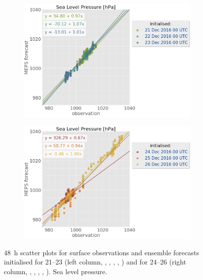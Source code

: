 \begin{figure}[t!]
	\centering
	\begin{subfigure}[b]{0.49\textwidth}
		\includegraphics[trim={0.cm 0cm 12.5cm 0cm},clip,
		width=\textwidth]{./fig_sfc_pressure/obs_model_20161221_23_00}
		\caption{}\label{fig:scat:pres2123}
	\end{subfigure}
	\begin{subfigure}[b]{0.49\textwidth}
		\includegraphics[trim={0.cm 0cm 12.5cm 0cm},clip,
		width=\textwidth]{./fig_sfc_pressure/obs_model_20161224_26_00}
		\caption{}\label{fig:scat:pres2426}
	\end{subfigure}
	\caption{\SI{48}{\hour} scatter plots for surface observations and ensemble forecasts initialised for \SIrange{21}{23}{\dec} (left column, \protect{}, \protect{}, \protect{}, \protect{}, \protect{}) and  for \SIrange{24}{26}{\dec} (right column, \protect{}, \protect{}, \protect{}, \protect{}, \protect{}). Sea level pressure.}\label{fig:scat:obs_meps}
\end{figure}
